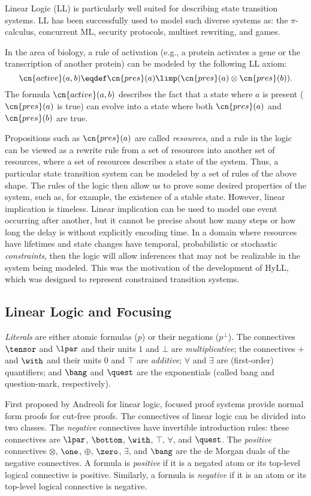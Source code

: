 \documentclass{llncs}
\begin{document}
Linear Logic (LL) \cite{girard87tcs} is particularly well suited for describing 
state transition systems. 
LL  has been successfully used to model such diverse systems as: 
the $\pi$-calculus, concurrent ML, security protocols, multiset rewriting, 
and games.

In the area of biology, a rule of activation 
(e.g., a protein activates a gene or the transcription of another protein)
can be modeled by the following LL axiom:
%
$$\cn{active}(a,b) \eqdef \cn{pres}(a) \limp (\cn{pres}(a) \otimes \cn{pres}(b)).$$
%
The formula $\cn{active}(a,b)$ describes the fact that a state where 
$a$ is present ($\cn{pres}(a)$ is true)
can evolve into a state where both  $\cn{pres}(a)$ and $\cn{pres}(b)$ are 
true.

Propositions such as $\cn{pres}(a)$ are called {\it resources}, and a rule in the logic 
can be viewed as a rewrite rule from a set of resources into another set of resources,
where a set of resources describes a state of the system.
%
Thus, a particular state transition system can be modeled by a set of rules of 
the above shape. The rules of the logic then allow us to prove some 
desired properties of the system, such as, for example, the existence of a stable state.
%
%
However, linear implication is timeless. 
Linear implication can be used to model one event
occurring after another, but it cannot be precise about how many steps
or how long the delay is without explicitly encoding time.
%
In a domain where
resources have lifetimes and state changes have temporal, probabilistic or
stochastic \emph{constraints}, then the logic will allow inferences that may not
be realizable in the system being modeled. 
%
This was the motivation of 
the development of HyLL, which was designed
to represent constrained transition systems.

\subsection{Linear Logic and Focusing} \label{sec:ll}
\emph{Literals} are either atomic formulas ($p$) or their
negations ($p^\bot$).  The connectives $\tensor$ and $\lpar$ and their units $1$
and $\bot$ are \emph{multiplicative}; the connectives $\plus$ and
$\with$ and their units $0$ and $\top$ are \emph{additive}; 
$\forall$ and $\exists$ are (first-order) quantifiers;
and $\bang$ and $\quest$ are the exponentials (called bang and question-mark,
respectively).  

First proposed by Andreoli \cite{DBLP:journals/logcom/Andreoli92} for linear logic,
focused proof systems provide  normal form proofs for cut-free proofs.
The connectives of linear logic can be divided into two classes.  The
{\em negative} connectives have invertible introduction rules: these
connectives are $\lpar$, $\bottom$, $\with$, $\top$, $\forall$, and
$\quest$.  The {\em positive} connectives 
$\otimes$, $\one$, $\oplus$,
$\zero$, $\exists$, and $\bang$
are the de Morgan duals of
the negative connectives.
  A formula is {\em positive} if it is
a negated atom or its top-level logical connective is positive.
Similarly, a formula is {\em negative} if it is an atom or its
top-level logical connective is negative. 
\end{document}
